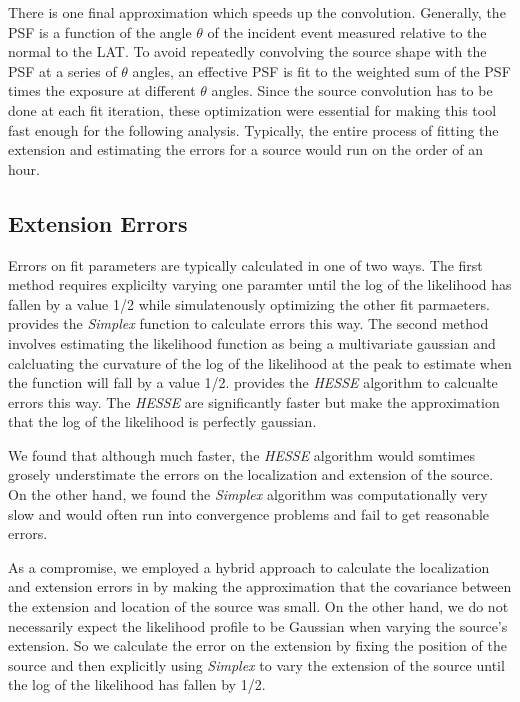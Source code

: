 \documentclass[preprint]{aastex}
\newcommand{\pointlike}{\text{\em pointlike}\xspace}
\newcommand{\minuit}{\text{\em Minuit}\xspace}
\begin{document}
There is one final approximation which speeds up the convolution.
Generally, the PSF is a function of the angle $\theta$ of the incident
event measured relative to the normal to the LAT. To avoid repeatedly
convolving the source shape with the PSF at a series of $\theta$ angles,
an effective PSF is fit to the weighted sum of the PSF times the exposure
at different $\theta$ angles.  Since the source convolution has to be
done at each fit iteration, these optimization were essential for making
this tool fast enough for the following analysis. Typically, the entire
process of fitting the extension and estimating the errors for a source
would run on the order of an hour.

\subsection{Extension Errors}

Errors on fit parameters are typically calculated in one of two ways. The
first method requires explicilty varying one paramter until the log of
the likelihood has fallen by a value 1/2 while simulatenously optimizing
the other fit parmaeters.  \minuit provides the {\em Simplex} function to
calculate errors this way.\cite{minuit documentation and UP parameter}
The second method involves estimating the likelihood function as being
a multivariate gaussian and calcluating the curvature of the log of
the likelihood at the peak to estimate when the function will fall by
a value 1/2. \minuit provides the {\em HESSE} algorithm to calcualte
errors this way.  The {\em HESSE} are significantly faster but make the
approximation that the log of the likelihood is perfectly gaussian.

We found that although much faster, the {\em HESSE} algorithm would
somtimes grosely understimate the errors on the localization and extension
of the source.  On the other hand, we found the {\em Simplex} algorithm
was computationally very slow and would often run into convergence
problems and fail to get reasonable errors.

As a compromise, we employed a hybrid approach to calculate
the localization and extension errors in \pointlike by making the
approximation that the covariance between the extension and location of
the source was small. On the other hand, we do not necessarily expect the
likelihood profile to be Gaussian when varying the source's extension.
So we calculate the error on the extension by fixing the position of the
source and then explicitly using {\em Simplex} to vary the extension of
the source until the log of the likelihood has fallen by 1/2.
\end{document}
